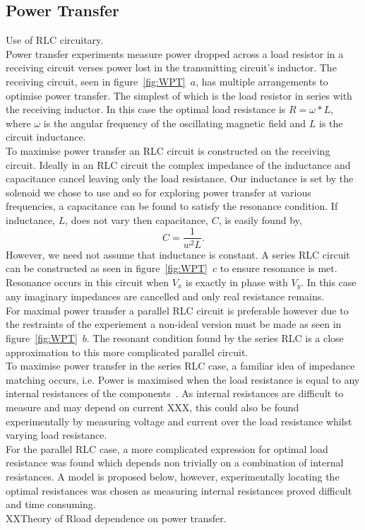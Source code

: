 \documentclass[11pt]{iopart}
\begin{document}
\subsection{Power Transfer}
Use of RLC circuitary.\\
Power transfer experiments measure power dropped across a load
resistor in a receiving circuit verses power lost in the transmitting
circuit's inductor. The receiving circuit, seen in
figure~\ref{fig:WPT}~$a$, has multiple arrangements to optimise
power transfer. The simplest of which is the load resistor in series
with the receiving inductor. In this case the optimal load resistance
is $R = \omega*L$, where $\omega$ is the angular frequency of the
oscillating magnetic field and $L$ is the circuit inductance.\\ To
maximise power transfer an RLC circuit is constructed on the receiving
circuit. Ideally in an RLC circuit the complex impedance of the
inductance and capacitance cancel leaving only the load
resistance. Our inductance is set by the solenoid we chose to use and
so for exploring power transfer at various frequencies, a capacitance
can be found to satisfy the resonance condition. If inductance, $L$,
does not vary then capacitance, $C$, is easily found by,
\begin{equation}
  C = \frac{1}{w^2L}.
\end{equation}
However, we need not assume that inductance is constant. A series RLC
circuit can be constructed as seen in figure~\ref{fig:WPT}~$c$ to
ensure resonance is met. Resonance occurs in this circuit when $V_x$
is exactly in phase with $V_y$. In this case any imaginary impedances
are cancelled and only real resistance remains. \\ For maximal power
transfer a parallel RLC circuit is preferable however due to the
restraints of the experiement a non-ideal version must be made as seen
in figure~\ref{fig:WPT}~$b$. The resonant condition found by the
series RLC is a close approximation to this more complicated parallel
circuit. \\
To maximise power transfer in the series RLC case, a familiar idea of
impedance matching occurs, i.e. Power is maximised when the load
resistance is equal to any internal resistances of the
components~\cite{XXX}. As internal resistances are difficult to
measure and may depend on current XXX, this could also be found
experimentally by measuring voltage and current over the load
resistance whilst varying load resistance. \\ For the parallel RLC
case, a more complicated expression for optimal load resistance was
found which depends non trivially on a combination of internal
resistances. A model is proposed below, however, experimentally
locating the optimal resistances was chosen as measuring internal
resistances proved difficult and time consuming.\\
XXTheory of Rload dependence on power transfer. \\
\end{document}
